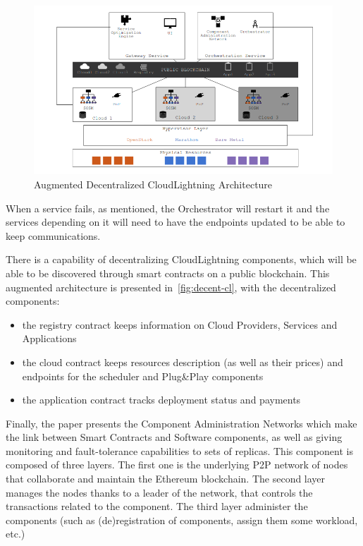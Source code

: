 \begin{figure}[htbp]
  \centering  \includegraphics[width=1\linewidth]{figs/png/decentralizedcloudlightning}
  \caption{Augmented Decentralized CloudLightning Architecture}
  \label{fig:decent-cl}
\end{figure}


When a service fails, as mentioned, the Orchestrator will restart it
and the services depending on it will need to have the endpoints
updated to be able to keep communications.

There is a capability of decentralizing CloudLightning components,
which will be able to be discovered through \glspl{smart contract} on
a public blockchain.
%
This augmented architecture is presented in~\autoref{fig:decent-cl},
with the decentralized components:
\begin{itemize}
\item the registry contract keeps information on Cloud Providers,
  Services and Applications
\item the cloud contract keeps resources description (as well as their
  prices) and endpoints for the scheduler and Plug\&Play components
\item the application contract tracks deployment status and payments
\end{itemize}

Finally, the paper presents the Component Administration Networks
which make the link between Smart Contracts and Software components,
as well as giving monitoring and fault-tolerance capabilities to sets
of replicas.
%
This component is composed of three layers.
%
The first one is the underlying \acrshort{P2P} network of nodes that
collaborate and maintain the Ethereum blockchain.
%
The second layer manages the nodes thanks to a leader of the network,
that controls the transactions related to the component.
%
The third layer administer the components (such as (de)registration of
components, assign them some workload, etc.)


